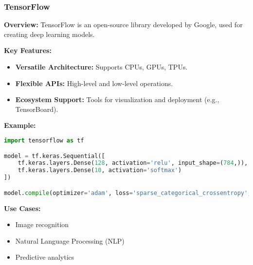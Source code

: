 \documentclass[aspectratio=169]{beamer}
\begin{document}
\begin{frame}[fragile]
    \frametitle{TensorFlow}
    \textbf{Overview:} TensorFlow is an open-source library developed by Google, used for creating deep learning models.

    \textbf{Key Features:}
    \begin{itemize}
        \item \textbf{Versatile Architecture:} Supports CPUs, GPUs, TPUs.
        \item \textbf{Flexible APIs:} High-level and low-level operations.
        \item \textbf{Ecosystem Support:} Tools for visualization and deployment (e.g., TensorBoard).
    \end{itemize}

    \textbf{Example:}
    \begin{lstlisting}[language=Python]
import tensorflow as tf

model = tf.keras.Sequential([
    tf.keras.layers.Dense(128, activation='relu', input_shape=(784,)),
    tf.keras.layers.Dense(10, activation='softmax')
])

model.compile(optimizer='adam', loss='sparse_categorical_crossentropy', metrics=['accuracy'])
    \end{lstlisting}

    \textbf{Use Cases:}
    \begin{itemize}
        \item Image recognition
        \item Natural Language Processing (NLP)
        \item Predictive analytics
    \end{itemize}
\end{frame}
\end{document}
